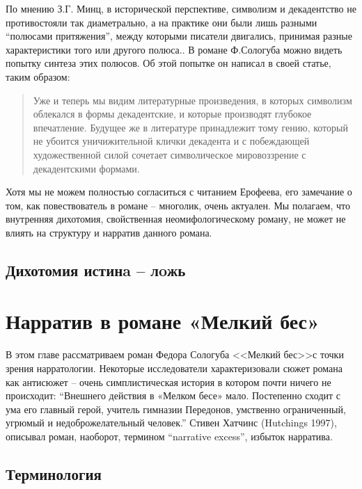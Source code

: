 \documentclass[12pt,a4paper]{article}
\begin{document}
По мнению З.Г. Минц, в исторической перспективе, символизм и декадентство не противостояли так диаметрально, а на практике они были лишь разными \enquote{полюсами притяжения}, между которыми писатели двигались, принимая разные характеристики того или другого полюса.\parencite[62]{mints2004}. В романе Ф.Сологуба можно видеть попытку синтеза этих полюсов. Об этой попытке он написал в своей статье, таким образом:

\begin{quote}
Уже и теперь мы видим литературные произведения, в которых символизм облекался в формы декадентские, и которые производят глубокое впечатление. Будущее же в литературе принадлежит тому гению, который не убоится уничижительной клички декадента и с побеждающей художественной силой сочетает символическое мировоззрение с декадентскими формами.
\parencite[501.]{ref:sologub2007}
\end{quote}


Хотя мы не можем полностью согласиться с читанием Ерофеева, его замечание о том, как повествователь в романе – многолик, очень актуален. Мы полагаем, что внутренняя дихотомия, свойственная неомифологическому роману, не может не влиять на структуру и нарратив данного романа. 

\subsection{Дихотомия истинa – лoжь}
\section{Нарратив в романе «Мелкий бес»}

В этом главе рассматриваем роман Федора Сологуба <<Мелкий бес>>с точки зрения нарратологии. Некоторые исследователи характеризовали сюжет романа как антисюжет -- очень симплистическая история в котором почти ничего не происходит: 
\enquote{Внешнего действия в «Мелком бесе» мало. Постепенно сходит с ума его главный герой, учитель гимназии Передонов, умственно ограниченный, угрюмый и недоброжелательный человек.}
\autocite[432.]{grigorjev1983} Стивен Хатчинс (Hutchings 1997), описывал роман, наоборот, термином \enquote{narrative excess}, избыток нарратива.


\subsection{Терминология}
\end{document}
